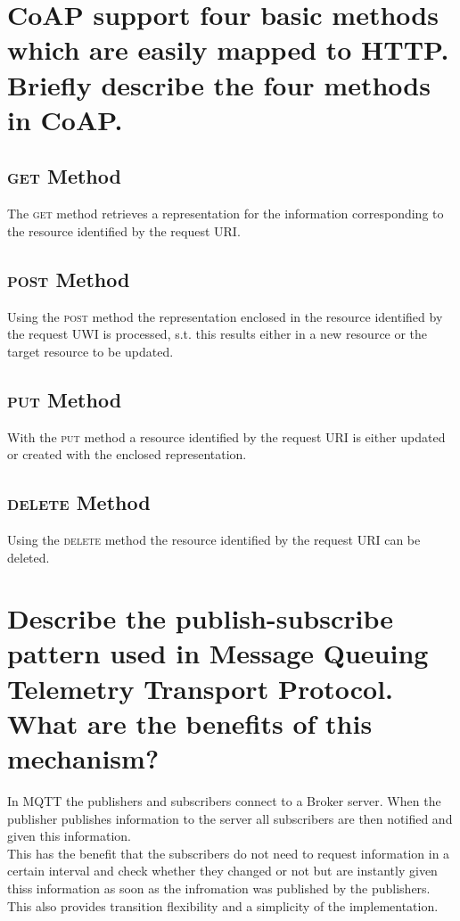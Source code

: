 \documentclass{report}
\begin{document}
	\section{CoAP support four basic methods which are easily mapped to HTTP. Briefly describe the four methods in CoAP.}
	\startsection
		\subsection{\textsc{get} Method}
		\startsubsection
			The \textsc{get} method retrieves a representation for the information corresponding to the resource identified by the request URI.
		\closesection
		\subsection{\textsc{post} Method}
		\startsubsection
			Using the \textsc{post} method the representation enclosed in the resource identified by the request UWI is processed, s.t. this results either in a new resource or the target resource to be updated.
		\closesection
		\subsection{\textsc{put} Method}
		\startsubsection
			With the \textsc{put} method a resource identified by the request URI is either updated or created with the enclosed representation.
		\closesection
		\subsection{\textsc{delete} Method}
		\startsubsection
			Using the \textsc{delete} method the resource identified by the request URI can be deleted.
		\closesection
	\closesection
	
	\section{Describe the publish-subscribe pattern used in Message Queuing Telemetry Transport Protocol. What are the benefits of this mechanism?}
	\startsection
		In MQTT the publishers and subscribers connect to a Broker server. When the publisher publishes information to the server all subscribers are then notified and given this information. \\
		This has the benefit that the subscribers do not need to request information in a certain interval and check whether they changed or not but are instantly given thiss information as soon as the infromation was published by the publishers. This also provides transition flexibility and a simplicity of the implementation.
	\closesection
\end{document}

